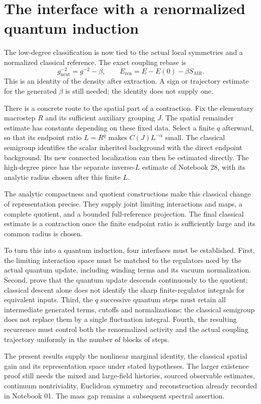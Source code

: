 \section{The interface with a renormalized quantum induction}
\label{gex-next-section}

The low-degree classification is now tied to the actual local
symmetries and a normalized classical reference. The exact
coupling rebase is
\[
 g_{\mathrm{next}}^{-2}=g^{-2}-\beta,\qquad
 E_{\mathrm{ren}}=E-E(0)-\beta S_{MR}.
\]
This is an identity of the density after extraction. A sign
or trajectory estimate for the generated \(\beta\) is still
needed; the identity does not supply one.

There is a concrete route to the spatial part of a contraction.
Fix the elementary macrostep \(R\) and its sufficient auxiliary
grouping \(J\). The spatial remainder estimate has constants
depending on these fixed data. Select a finite \(q\) afterward,
so that its endpoint ratio \(L=R^q\) makes
\(C(J)L^{-\alpha}\) small. The classical semigroup identifies
the scalar inherited background with the direct endpoint
background. Its new connected localization can then be
estimated directly. The high-degree piece has the separate
inverse-\(L\) estimate of Notebook 28, with its analytic radius
chosen after this finite \(L\).

The analytic compactness and quotient constructions make
this classical change of representation precise. They supply
joint limiting interactions and maps, a complete quotient,
and a bounded full-reference projection. The final classical
estimate is a contraction once the finite endpoint ratio
is sufficiently large and its common radius is chosen.

To turn this into a quantum induction, four interfaces must
be established. First, the limiting interaction space must
be matched to the regulators used by the actual quantum update,
including winding terms and its vacuum normalization.
Second, prove that the quantum update descends continuously
to the quotient; classical descent alone does not identify
the sharp finite-regulator integrals for equivalent inputs.
Third, the \(q\) successive
quantum steps must retain all intermediate generated terms,
cutoffs and normalizations; the classical semigroup does not
replace them by a single fluctuation integral. Fourth, the
resulting recurrence must control both the renormalized
activity and the actual coupling trajectory uniformly in
the number of blocks of steps.

The present results supply the nonlinear marginal identity,
the classical spatial gain and its representation space
under stated hypotheses. The larger existence proof
still needs the mixed and large-field histories, sourced
observable estimates, continuum nontriviality, Euclidean
symmetry and reconstruction already recorded in Notebook 01.
The mass gap remains a subsequent spectral assertion.

